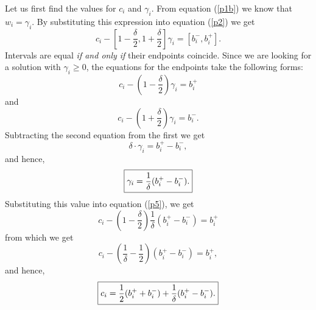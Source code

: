 Let us first find the values for $c_i$ and $\gamma_i$.  From equation
(\ref{p1b}) we know that $w_i = \gamma_i$.  By substituting this expression
into equation (\ref{p2}) we get
$$
  c_i - [1 - \frac{\delta}{2}, 1 + \frac{\delta}{2}] \gamma_i =
   [b_i^-, b_i^+]. \label{p4}
$$
Intervals are equal {\em if and only if\/} their endpoints coincide.  Since we
are looking for a solution with $\gamma_i\geq 0$, the equations for the
endpoints take the following forms:
\begin{equation}
  c_i - (1 - \frac{\delta}{2}) \gamma_i = b_i^+ \label{p5}
\end{equation}
and
\begin{equation}
  c_i - (1 + \frac{\delta}{2}) \gamma_i = b_i^-. \label{p6}
\end{equation}
Subtracting the second equation from the first we get
$$
  \delta\cdot\gamma_i = b_i^+ - b_i^-,
$$
and hence,
\begin{equation}
  \fbox{${\displaystyle\gamma_i=\frac{1}{\delta}(b_i^+-b_i^-).}$} \label{GAMMA}
\end{equation}
Substituting this value into equation (\ref{p5}), we get
$$
  c_i - (1 - \frac{\delta}{2}) \frac{1}{\delta}(b_i^+ - b_i^-) = b_i^+
$$
from which we get
$$
  c_i - (\frac{1}{\delta} - \frac{1}{2}) (b_i^+ - b_i^-) =  b_i^+,
$$
and hence,
\begin{equation}
  \fbox{${\displaystyle c_i=\frac{1}{2}(b_i^++b_i^-)
   +\frac{1}{\delta}(b_i^+-b_i^-).}$}                                 \label{C}
\end{equation}

